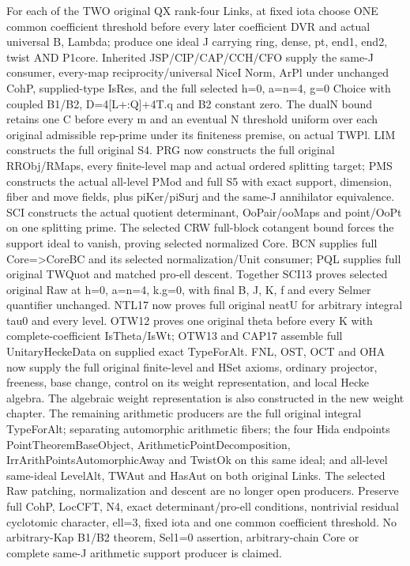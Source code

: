 \documentclass[11pt,a4paper]{article}
\numberwithin{equation}{section}
\theoremstyle{remark}\newtheorem{remark}[theorem]{Remark}
\begin{document}
For each of the TWO original QX rank-four Links, at fixed iota choose ONE common coefficient threshold before every later coefficient DVR and actual universal B,\allowbreak{} Lambda; produce one ideal J carrying ring,\allowbreak{} dense,\allowbreak{} pt,\allowbreak{} end1,\allowbreak{} end2,\allowbreak{} twist AND P1core. Inherited JSP/\allowbreak{}CIP/\allowbreak{}CAP/\allowbreak{}CCH/\allowbreak{}CFO supply the same-J consumer, every-map reciprocity/\allowbreak{}universal NiceI Norm, ArPl under unchanged CohP, supplied-type IsRes, and the full selected h=0,\allowbreak{} a=n=4,\allowbreak{} g=0 Choice with coupled B1/\allowbreak{}B2, D=4[L+:Q]+4T.q and B2 constant zero. The dualN bound retains one C before every m and an eventual N threshold uniform over each original admissible rep-prime under its finiteness premise, on actual TWPl. LIM constructs the full original S4. PRG now constructs the full original RRObj/\allowbreak{}RMaps, every finite-level map and actual ordered splitting target; PMS constructs the actual all-level PMod and full S5 with exact support, dimension, fiber and move fields, plus piKer/\allowbreak{}piSurj and the same-J annihilator equivalence. SCI constructs the actual quotient determinant, OoPair/\allowbreak{}ooMaps and point/\allowbreak{}OoPt on one splitting prime. The selected CRW full-block cotangent bound forces the support ideal to vanish, proving selected normalized Core. BCN supplies full Core=>CoreBC and its selected normalization/\allowbreak{}Unit consumer; PQL supplies full original TWQuot and matched pro-ell descent. Together SCI13 proves selected original Raw at h=0,\allowbreak{} a=n=4,\allowbreak{} k.g=0, with final B,\allowbreak{} J,\allowbreak{} K,\allowbreak{} f and every Selmer quantifier unchanged. NTL17 now proves full original neatU for arbitrary integral tau0 and every level. OTW12 proves one original theta before every K with complete-coefficient IsTheta/\allowbreak{}IsWt; OTW13 and CAP17 assemble full UnitaryHeckeData on supplied exact TypeForAlt. FNL, OST, OCT and OHA now supply the full original finite-level and HSet axioms, ordinary projector, freeness, base change, control on its weight representation, and local Hecke algebra. The algebraic weight representation is also constructed in the new weight chapter. The remaining arithmetic producers are the full original integral TypeForAlt; separating automorphic arithmetic fibers; the four Hida endpoints PointTheoremBaseObject, ArithmeticPointDecomposition, IrrArithPointsAutomorphicAway and TwistOk on this same ideal; and all-level same-ideal LevelAlt, TWAut and HasAut on both original Links. The selected Raw patching, normalization and descent are no longer open producers. Preserve full CohP, LocCFT, N4, exact determinant/\allowbreak{}pro-ell conditions, nontrivial residual cyclotomic character, ell=3, fixed iota and one common coefficient threshold. No arbitrary-Kap B1/\allowbreak{}B2 theorem, Sel1=0 assertion, arbitrary-chain Core or complete same-J arithmetic support producer is claimed.
\end{document}
